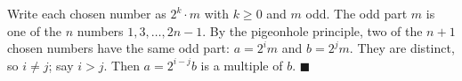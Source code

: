 Write each chosen number as $2^k\cdot m$ with $k\ge0$ and $m$ odd. The odd part $m$ is one of the $n$ numbers $1,3,\dots,2n-1$. By the pigeonhole principle, two of the $n+1$ chosen numbers have the same odd part: $a=2^im$ and $b=2^jm$. They are distinct, so $i\ne j$; say $i>j$. Then $a=2^{i-j}b$ is a multiple of $b$. $\blacksquare$
